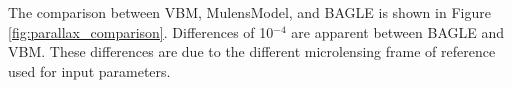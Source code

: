 \documentclass[twocolumn]{aastex701}
\begin{document}
The comparison between VBM, MulensModel, and BAGLE is shown in Figure \ref{fig:parallax_comparison}. Differences of 10$^{-4}$ are apparent between BAGLE and VBM. These differences are due to the different microlensing frame of reference used for input parameters.












\end{document}
